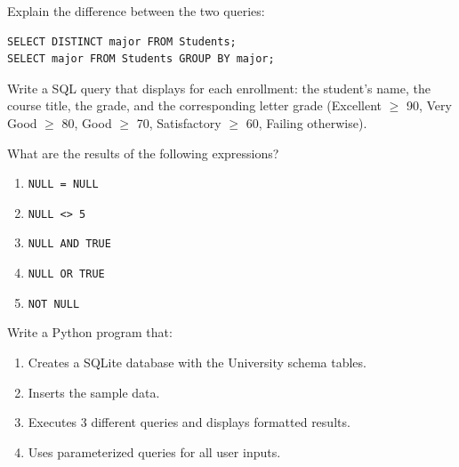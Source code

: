 \begin{exercise}
Explain the difference between the two queries:
\begin{verbatim}
SELECT DISTINCT major FROM Students;
SELECT major FROM Students GROUP BY major;
\end{verbatim}
\end{exercise}

\begin{exercise}
Write a SQL query that displays for each enrollment: the student's name,
the course title, the grade, and the corresponding letter grade
(Excellent $\geq$ 90, Very Good $\geq$ 80, Good $\geq$ 70,
Satisfactory $\geq$ 60, Failing otherwise).
\end{exercise}

\begin{exercise}
What are the results of the following expressions?
\begin{enumerate}
    \item \texttt{NULL = NULL}
    \item \texttt{NULL <> 5}
    \item \texttt{NULL AND TRUE}
    \item \texttt{NULL OR TRUE}
    \item \texttt{NOT NULL}
\end{enumerate}
\end{exercise}

\begin{exercise}
Write a Python program that:
\begin{enumerate}
    \item Creates a SQLite database with the University schema tables.
    \item Inserts the sample data.
    \item Executes 3 different queries and displays formatted results.
    \item Uses parameterized queries for all user inputs.
\end{enumerate}
\end{exercise}
